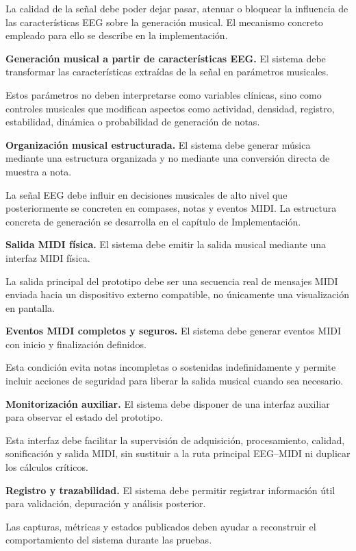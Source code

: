 \documentclass[../main.tex]{subfiles}
\begin{document}
\begin{description}[leftmargin=!,labelwidth=2cm]
    La calidad de la señal debe poder dejar pasar, atenuar o bloquear la influencia de las características EEG sobre la generación musical. El mecanismo concreto empleado para ello se describe en la implementación.

    \item[RF-12] \textbf{Generación musical a partir de características EEG.} El sistema debe transformar las características extraídas de la señal en parámetros musicales.

    Estos parámetros no deben interpretarse como variables clínicas, sino como controles musicales que modifican aspectos como actividad, densidad, registro, estabilidad, dinámica o probabilidad de generación de notas.

    \item[RF-13] \textbf{Organización musical estructurada.} El sistema debe generar música mediante una estructura organizada y no mediante una conversión directa de muestra a nota.

    La señal EEG debe influir en decisiones musicales de alto nivel que posteriormente se concreten en compases, notas y eventos MIDI. La estructura concreta de generación se desarrolla en el capítulo de Implementación.

    \item[RF-14] \textbf{Salida MIDI física.} El sistema debe emitir la salida musical mediante una interfaz MIDI física.

    La salida principal del prototipo debe ser una secuencia real de mensajes MIDI enviada hacia un dispositivo externo compatible, no únicamente una visualización en pantalla.

    \item[RF-15] \textbf{Eventos MIDI completos y seguros.} El sistema debe generar eventos MIDI con inicio y finalización definidos.

    Esta condición evita notas incompletas o sostenidas indefinidamente y permite incluir acciones de seguridad para liberar la salida musical cuando sea necesario.

    \item[RF-16] \textbf{Monitorización auxiliar.} El sistema debe disponer de una interfaz auxiliar para observar el estado del prototipo.

    Esta interfaz debe facilitar la supervisión de adquisición, procesamiento, calidad, sonificación y salida MIDI, sin sustituir a la ruta principal EEG--MIDI ni duplicar los cálculos críticos.

    \item[RF-17] \textbf{Registro y trazabilidad.} El sistema debe permitir registrar información útil para validación, depuración y análisis posterior.

    Las capturas, métricas y estados publicados deben ayudar a reconstruir el comportamiento del sistema durante las pruebas.

\end{description}
\end{document}
